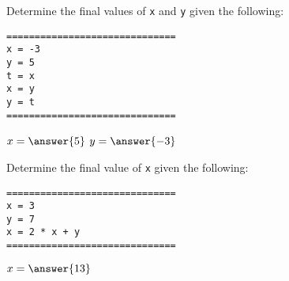 \documentclass{ximera}
\begin{document}
\begin{question}
	Determine the final values of \verb|x| and \verb|y| given the following:
	\begin{verbatim}
==============================
x = -3
y = 5
t = x
x = y
y = t
==============================
	\end{verbatim}
	$x = \answer{5}$
	$y = \answer{-3}$
\end{question}

\begin{question}
	Determine the final value of \verb|x| given the following:
	\begin{verbatim}
==============================
x = 3
y = 7
x = 2 * x + y
==============================
	\end{verbatim}
	$x = \answer{13}$
\end{question}
\end{document}
